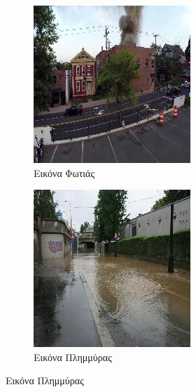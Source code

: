 \begin{figure}[h]
    \centering
    \begin{subfigure}{0.45\textwidth}
        \centering
        \includegraphics[width=\linewidth]{figures/chapter2/fire.jpg}
        \caption{Εικόνα Φωτιάς}
        \label{fig:image1}
    \end{subfigure}
    \begin{subfigure}{0.45\textwidth}
        \centering
        \includegraphics[width=\linewidth]{figures/chapter2/flood.jpg}
        \caption{Εικόνα Πλημμύρας}
        \label{fig:image2}
    \end{subfigure}
    

\end{figure}
